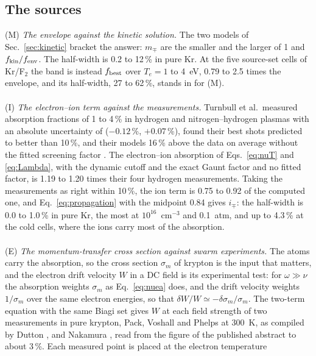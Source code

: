 \documentclass[11pt]{article}
\numberwithin{equation}{section}
\newcommand{\fbest}{f_{\rm best}}
\newcommand{\Te}{T_e}
\begin{document}
\subsection{The sources}
\label{sec:sources}
{\noindent}(M) \emph{The envelope against the kinetic solution.} The two models of
Sec.~\ref{sec:kinetic} bracket the answer: $m_\mp$ are the smaller and the larger of 1
and $f_{\rm kin}/f_{\rm env}$. The half-width is 0.2 to 12\,\% in pure Kr. At the five
source-set cells of Kr/F$_2$ the band is instead $\fbest$ over $\Te=1$ to 4~eV, 0.79 to 2.5
times the envelope, and its half-width, 27 to 62\,\%, stands in for (M).
\\ \\
{\noindent}(I) \emph{The electron--ion term against the measurements.} Turnbull et al.\
measured absorption fractions of 1 to 4\,\% in hydrogen and nitrogen--hydrogen plasmas
with an absolute uncertainty of ($-0.12$\,\%, $+0.07$\,\%), found their best shots
predicted to better than 10\,\%, and their models 16\,\% above the data on average without
the fitted screening factor \cite{Turnbull2023,Turnbull2024}. The electron--ion
absorption of Eqs.~\eqref{eq:nuT} and \eqref{eq:Lambda}, with the dynamic cutoff and the
exact Gaunt factor and no fitted factor, is 1.19 to 1.20 times their four hydrogen
measurements. Taking the measurements as right within 10\,\%, the ion term is 0.75 to
0.92 of the computed one, and Eq.~\eqref{eq:propagation} with the midpoint 0.84 gives
$i_\mp$: the half-width is 0.0 to 1.0\,\% in pure Kr, the most at $10^{16}$~cm$^{-3}$ and
0.1~atm, and up to 4.3\,\% at the cold cells, where the ions carry most of the absorption.
\\ \\
{\noindent}(E) \emph{The momentum-transfer cross section against swarm experiments.} The
atoms carry the absorption, so the cross section $\sigma_m$ of krypton is the input that matters,
and the electron drift velocity $W$ in a DC field is its experimental test: for $\omega\gg\nu$ the
absorption weights $\sigma_m$ as Eq.~\eqref{eq:nuea} does, and the drift velocity weights
$1/\sigma_m$ over the same electron energies, so that $\delta W/W\simeq-\delta\sigma_m/\sigma_m$. The
two-term equation \cite{HP2005} with the same Biagi set gives $W$ at each field strength of two
measurements in pure krypton, Pack, Voshall and Phelps \cite{Pack1962} at 300~K, as compiled by
Dutton \cite{Dutton1975}, and Nakamura \cite{Nakamura1991}, read from the figure of the published
abstract to about 3\,\%. Each measured point is placed at the electron temperature
\end{document}
